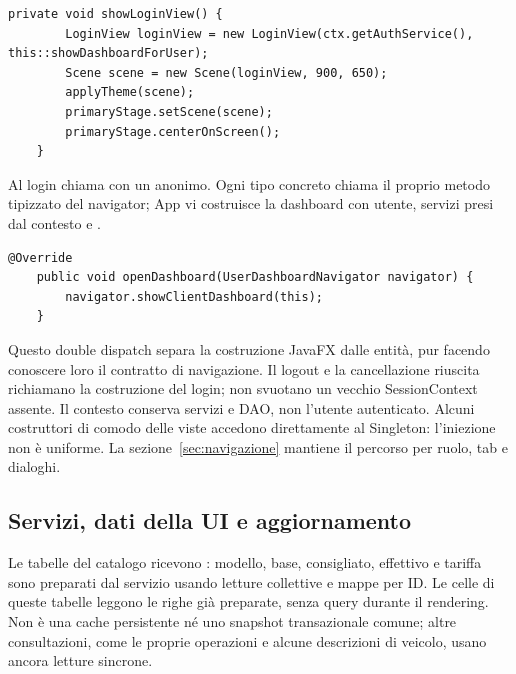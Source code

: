 \noindent\begin{minipage}{\linewidth}
\begin{lstlisting}[firstnumber=54,gobble=4,caption={Costruzione di LoginView e passaggio dei collaboratori.},label=lst:app-login]
    private void showLoginView() {
        LoginView loginView = new LoginView(ctx.getAuthService(), this::showDashboardForUser);
        Scene scene = new Scene(loginView, 900, 650);
        applyTheme(scene);
        primaryStage.setScene(scene);
        primaryStage.centerOnScreen();
    }
\end{lstlisting}
\end{minipage}

{\raggedright
Al login  chiama 
con un  anonimo. Ogni tipo concreto chiama
il proprio metodo tipizzato del navigator; App vi costruisce la dashboard
con utente, servizi presi dal contesto e .\par}


\noindent\begin{minipage}{\linewidth}
\begin{lstlisting}[firstnumber=32,caption={\code{Client.java}: selezione dell'overload del navigator con il tipo concreto.},
  label=lst:navigazione]
    @Override
    public void openDashboard(UserDashboardNavigator navigator) {
        navigator.showClientDashboard(this);
    }
\end{lstlisting}
\end{minipage}

Questo double dispatch separa la costruzione JavaFX dalle entità, pur
facendo conoscere loro il contratto di navigazione. Il logout e la
cancellazione riuscita richiamano la costruzione del login; non svuotano
un vecchio SessionContext assente. Il contesto conserva servizi e DAO,
non l'utente autenticato. Alcuni costruttori di comodo delle viste accedono
direttamente al Singleton: l'iniezione non è uniforme. La
sezione~\ref{sec:navigazione} mantiene il percorso per ruolo, tab e dialoghi.

\subsection{Servizi, dati della UI e aggiornamento}\label{sec:impl-refresh}
Le tabelle del catalogo ricevono : modello,
base, consigliato, effettivo e tariffa sono preparati dal servizio usando
letture collettive e mappe per ID. Le celle di queste tabelle leggono
le righe già preparate, senza query durante il rendering. Non è una cache
persistente né uno snapshot transazionale comune; altre consultazioni,
come le proprie operazioni e alcune descrizioni di veicolo, usano ancora
letture sincrone.

